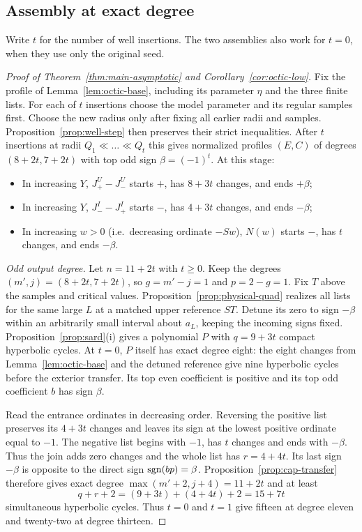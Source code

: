 \subsection{Assembly at exact degree}\label{subsec:prove-asymptotic}
Write $t$ for the number of well insertions. The two assemblies also
work for $t=0$, when they use only the original seed.

\begin{proof}[Proof of Theorem~\ref{thm:main-asymptotic} and Corollary~\ref{cor:octic-low}]

Fix the profile of Lemma~\ref{lem:octic-base}, including its parameter $\eta$
and the three finite lists. For each of $t$ insertions choose the model
parameter and its regular samples first. Choose the new radius only after
fixing all earlier radii and samples. Proposition~\ref{prop:well-step}
then preserves their strict inequalities. After $t$ insertions at radii
$Q_1\ll\dots\ll Q_t$ this gives normalized profiles $(E,C)$ of degrees $(8+2t,7+2t)$ with top odd sign $\beta=(-1)^t$. At this stage:
\begin{itemize}
  \item In increasing $Y$, $J_+^U-J_-^U$ starts $+$, has $8+3t$ changes, and ends $+\beta$;
  \item In increasing $Y$, $J_-^I-J_+^I$ starts $-$, has $4+3t$ changes, and ends $-\beta$;
  \item In increasing $w>0$ (i.e.\ decreasing ordinate $-Sw$), $N(w)$ starts $-$, has $t$ changes, and ends $-\beta$.
\end{itemize}

\emph{Odd output degree.}
Let $n=11+2t$ with $t\ge0$. Keep the degrees $(m',j)=(8+2t,7+2t)$,
so $g=m'-j=1$ and $p=2-g=1$. Fix $T$ above the samples and critical
values. Proposition~\ref{prop:physical-quad} realizes all lists for the
same large $L$ at a matched upper reference $ST$. Detune its zero to
sign $-\beta$ within an arbitrarily small interval about $a_L$, keeping
the incoming signs fixed. Proposition~\ref{prop:sard}(i) gives a
polynomial $P$ with $q=9+3t$ compact hyperbolic cycles.
\hypertarget{octic-core}{At $t=0$}, $P$ itself has exact degree eight:
the eight changes from Lemma~\ref{lem:octic-base} and the detuned reference
give nine hyperbolic cycles before the exterior transfer. Its top even
coefficient is positive and its top odd coefficient $b$ has sign $\beta$.

Read the entrance ordinates in decreasing order. Reversing the positive
list preserves its $4+3t$ changes and leaves its sign at the lowest
positive ordinate equal to $-1$. The negative list begins with $-1$,
has $t$ changes and ends with $-\beta$. Thus the join adds zero changes
and the whole list has $r=4+4t$. Its last sign $-\beta$ is opposite to
the direct sign $\operatorname{sgn}(bp)=\beta$. Proposition~\ref{prop:cap-transfer}
therefore gives exact degree $\max(m'+2,j+4)=11+2t$ and at least
\[
                 q+r+2=(9+3t)+(4+4t)+2=15+7t
\]
simultaneous hyperbolic cycles. \hypertarget{odd-closure}{Thus $t=0$ and
$t=1$ give fifteen at degree eleven and twenty-two at degree thirteen.}


\end{proof}
